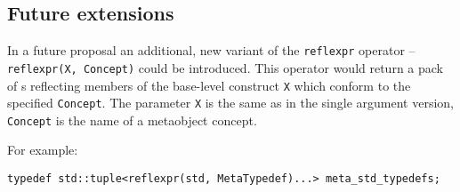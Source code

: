 \subsection{Future extensions}

In a future proposal an additional, new variant of the \texttt{reflexpr} operator
-- \texttt{reflexpr(X, Concept)} could be introduced.
This operator would return a pack of s reflecting members of
the base-level construct \texttt{X} which conform to the specified
\texttt{Concept}. The parameter \texttt{X} is the same as in the single argument
version, \texttt{Concept} is the name of a metaobject concept.

For example:

\begin{verbatim}
typedef std::tuple<reflexpr(std, MetaTypedef)...> meta_std_typedefs;
\end{verbatim}
